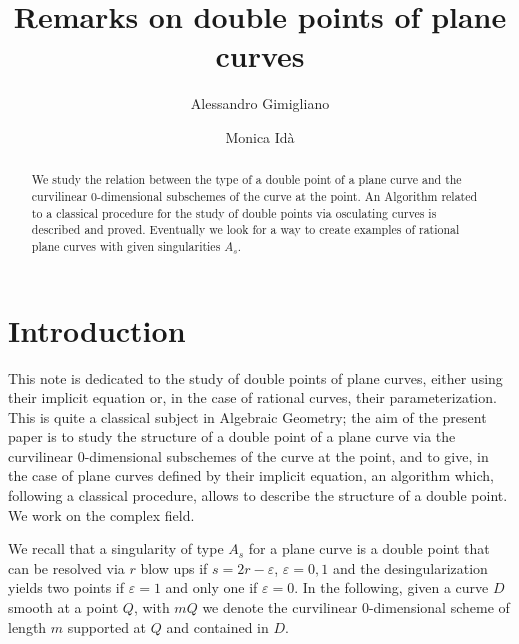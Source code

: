 \documentclass[draft]{amsart}
\theoremstyle{definition}
\theoremstyle{remark}
\theoremstyle{definition}
\def\e{\varepsilon}
\begin{document}
\title{Remarks on double points of plane curves}

\author[A. Gimigliano]{Alessandro Gimigliano}
\address[Alessandro Gimigliano]{Dipartimento di Matematica, Università di Bologna, Italy}


\author[M. Id\`a]{Monica Id\`a}
\address[Monica Id\`a]{Dipartimento di Matematica, Università di Bologna, Italy}




\maketitle



\begin{abstract}
We study the relation between the type of a double point of a plane curve and the curvilinear 0-dimensional subschemes of the curve at the point. An Algorithm related to a classical procedure for the study of double points via osculating curves is described and proved. Eventually we look for a way to create examples of rational plane curves with given singularities $A_s$.
 \end{abstract}


\section{Introduction}

This note is dedicated to the study of double points of plane curves, either using their implicit equation or, in the case of rational curves, their parameterization. This is quite a classical subject in Algebraic Geometry; the aim of the present paper is to study the structure of a double point of a plane curve via the curvilinear 0-dimensional subschemes of the curve at the point, and to give, in the case of plane curves defined by their implicit equation, an algorithm which, following a classical procedure, allows to describe the structure of a double point.
We work on the complex field.
\par \medskip We recall that a singularity of type $A_s$ for a plane curve is a double point that can be resolved via $r$ blow ups if $s=2r-\e$, $\e =0,1$ and the desingularization yields two points if $\e =1$ and only one if $\e =0$. In the following, given a curve $D$ smooth at a point $Q$, with $mQ$ we denote the curvilinear 0-dimensional scheme of length $m$ supported at $Q$ and contained in $D$.
\end{document}
